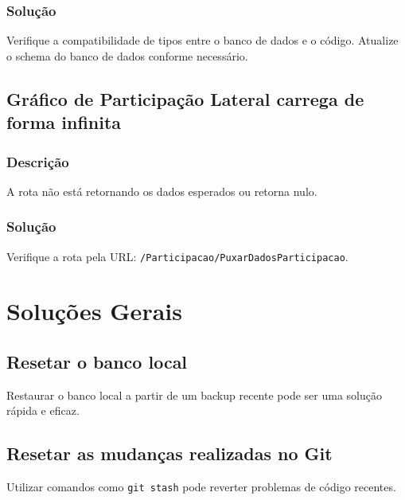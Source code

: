 \documentclass[12pt]{article}
\begin{document}
\subsubsection{Solução}
Verifique a compatibilidade de tipos entre o banco de dados e o código. Atualize o schema do banco de dados conforme necessário.

\subsection{Gráfico de Participação Lateral carrega de forma infinita}
\subsubsection{Descrição}
A rota não está retornando os dados esperados ou retorna nulo.

\subsubsection{Solução}
Verifique a rota pela URL: \texttt{/Participacao/PuxarDadosParticipacao}.

\section{Soluções Gerais}
\subsection{Resetar o banco local}
Restaurar o banco local a partir de um backup recente pode ser uma solução rápida e eficaz.

\subsection{Resetar as mudanças realizadas no Git}
Utilizar comandos como \texttt{git stash} pode reverter problemas de código recentes.
\end{document}
